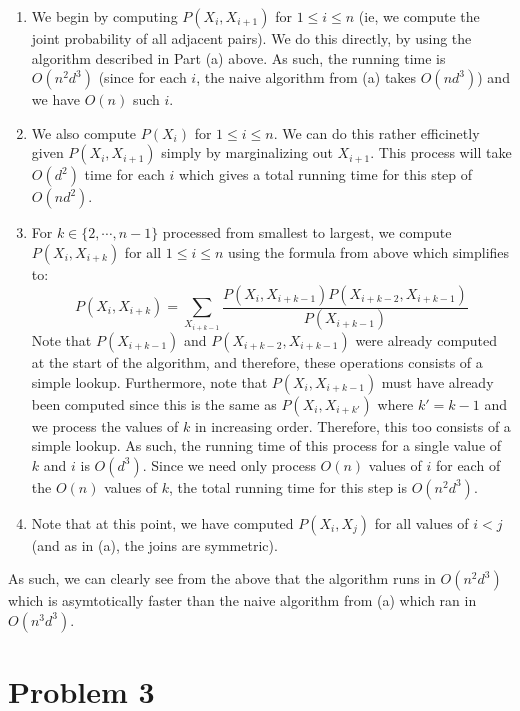 \documentclass[12pt]{article}
\begin{document}
\begin{enumerate}[label=(\alph*)]
  \begin{enumerate}
  	\item We begin by computing $P(X_i, X_{i+1})$ for $1 \leq i \leq n$ (ie, we compute the joint probability of all adjacent pairs). We do this directly, by using the algorithm described in Part (a) above. As such, the running time is $O(n^2d^3)$ (since for each $i$, the naive algorithm from (a) takes $O(nd^3)$) and we have $O(n)$ such $i$. 
  	\item We also compute $P(X_i)$ for $1 \leq i \leq n$. We can do this rather efficinetly given $P(X_i, X_{i+1})$ simply by marginalizing out $X_{i+1}$. This process will take $O(d^2)$ time for each $i$ which gives a total running time for this step of $O(nd^2)$.
  	\item For $k \in \{2,\cdots, n-1\}$ processed from smallest to largest, we compute $P(X_i, X_{i+k})$ for all $1 \leq i \leq n$ using the formula from above which simplifies to:
  	$$
  		P(X_i, X_{i+k}) = \sum_{X_{i+k-1}} \frac{P(X_i, X_{i+k-1})P(X_{i+k-2}, X_{i+k-1})}{P(X_{i+k-1})}
  	$$
  	Note that $P(X_{i+k-1})$ and $P(X_{i+k-2}, X_{i+k-1})$ were already computed at the start of the algorithm, and therefore, these operations consists of a simple lookup. Furthermore, note that $P(X_i, X_{i+k-1})$ must have already been computed since this is the same as $P(X_i, X_{i+k'})$ where $k' = k - 1$ and we process the values of $k$ in increasing order. Therefore, this too consists of a simple lookup. As such, the running time of this process for a single value of $k$ and $i$ is $O(d^3)$. Since we need only process $O(n)$ values of $i$ for each of the $O(n)$ values of $k$, the total running time for this step is $O(n^2d^3)$.
  	\item Note that at this point, we have computed $P(X_i,X_j)$ for all values of $i < j$ (and as in (a), the joins are symmetric).
  \end{enumerate}

  As such, we can clearly see from the above that the algorithm runs in $O(n^2d^3)$ which is asymtotically faster than the naive algorithm from (a) which ran in $O(n^3d^3)$.

\end{enumerate}

\pagebreak
\section*{Problem 3}
\end{document}
